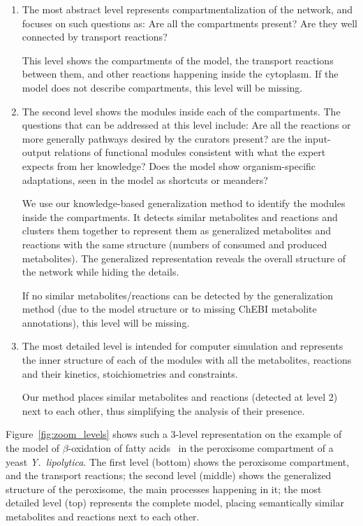\documentclass{bmcart}
\begin{document}
\begin{enumerate}
\item The most abstract level represents compartmentalization of the network, and focuses
  on such questions as: Are all the compartments present? Are they well connected by
  transport reactions? 

  This level shows the compartments of the model, the transport reactions between them,
  and other reactions happening inside the cytoplasm.  If the model does not describe
  compartments, this level will be missing.

\item The second level shows the modules inside each of the compartments. The questions
  that can be addressed at this level include: Are all the reactions or more generally pathways
  desired by the curators present? are the input-output relations of functional modules
  consistent with what the expert expects from her knowledge? Does the model show
  organism-specific adaptations, seen in the model as shortcuts or meanders?

  We use our knowledge-based generalization method to identify the modules inside the
  compartments. It detects similar metabolites and reactions and clusters them together to
  represent them as generalized metabolites and reactions with the same structure (numbers
  of consumed and produced metabolites). The generalized representation reveals the
  overall structure of the network while hiding the details.

  If no similar metabolites/reactions can be detected by the generalization method (due to
  the model structure or to missing ChEBI metabolite annotations), this level will be
  missing.

\item The most detailed level is intended for computer simulation and represents the inner
  structure of each of the modules with all the metabolites, reactions and their kinetics,
  stoichiometries and constraints.

  Our method places similar metabolites and reactions (detected at level 2) next to each
  other, thus simplifying the analysis of their presence.
\end{enumerate}
  
 Figure~\ref{fig:zoom_levels} shows such a 3-level representation on the example of the model of $\beta$-oxidation of fatty acids~\cite{Metzler01} in the peroxisome compartment of a yeast \textit{Y.~lipolytica}. The first level (bottom) shows the peroxisome compartment, and the transport reactions; the second level (middle) shows the generalized structure of the peroxisome, the main processes happening in it; the most detailed level (top) represents the complete model, placing semantically similar metabolites and reactions next to each other.
\end{document}
